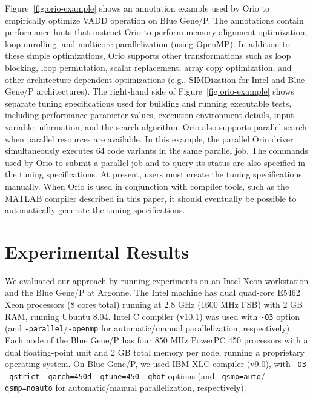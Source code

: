 \documentclass[runningheads]{llncs}
\begin{document}
Figure~\ref{fig:orio-example} shows an annotation example used by Orio
to empirically optimize VADD operation on Blue Gene/P. The annotations
contain performance hints that instruct Orio to perform memory
alignment optimization, loop unrolling, and multicore parallelization
(using OpenMP). In addition to these simple optimizations, Orio
supports other transformations such as loop blocking, loop
permutation, scalar replacement, array copy optimization, and other
architecture-dependent optimizations (e.g., SIMDization for Intel and
Blue Gene/P architectures). The right-hand side of
Figure~\ref{fig:orio-example} shows separate tuning specifications
used for building and running executable tests, including performance
parameter values, execution environment details, input variable
information, and the search algorithm. Orio also supports parallel
search when parallel resources are available. In this example, the
parallel Orio driver simultaneously executes 64 code variants in the
same parallel job. The commands used by Orio to submit a parallel job
and to query its status are also specified in the tuning
specifications. At present, users must create the tuning
specifications manually. When Orio is used in conjunction with
compiler tools, such as the MATLAB compiler described in this paper,
it should eventually be possible to automatically generate the tuning
specifications.

\vspace{-0.1in}

\section{Experimental Results}
\label{sec:experiments}

We evaluated our approach by running experiments on an Intel Xeon
workstation and the Blue Gene/P at Argonne. The Intel machine has dual
quad-core E5462 Xeon processors (8 cores total) running at 2.8 GHz
(1600 MHz FSB) with 2 GB RAM, running Ubuntu 8.04. Intel C compiler
(v10.1) was used with \texttt{-O3} option (and
\texttt{-parallel}/\texttt{-openmp} for automatic/manual
parallelization, respectively). Each node of the Blue Gene/P has four
850 MHz PowerPC 450 processors with a dual floating-point unit and 2
GB total memory per node, running a proprietary operating system. On
Blue Gene/P, we used IBM XLC compiler (v9.0), with \texttt{-O3
-qstrict -qarch=450d -qtune=450 -qhot} options (and
\texttt{-qsmp=auto}/\texttt{-qsmp=noauto} for automatic/manual
parallelization, respectively).
\end{document}

